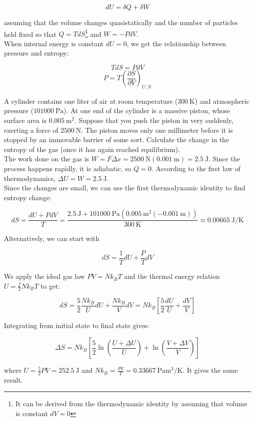 \[dU=\delta Q+\delta W\]

assuming that the volume changes quasistatically and the number of particles held fixed so that $Q=TdS$\footnote{It can be derived from the thermodynamic identity by assuming that volume is constant $dV=0$} and $W=-PdV$. \\

When internal energy is constant $dU=0$, we get the relationship between pressure and entropy:

\[TdS=PdV\]
\[P=T\left(\frac{\partial S}{\partial V}\right)_{U,N}\]

\begin{texample}
	A cylinder contains one liter of air at room temperature ($\SI{300}{\kelvin}$) and atmospheric pressure ($\SI{101000}{\pascal}$). At one end of the cylinder is a massive piston, whose surface area is $\SI{0.005}{\meter\squared}$. Suppose that you push the piston in very suddenly, exerting a force of $\SI{2500}{\newton}$. The piston moves only one millimeter before it is stopped by an immovable barrier of some sort. Calculate the change in the entropy of the gas (once it has again reached equilibrium). \\
	
	The work done on the gas is $W=F\Delta x=\SI{2500}{\newton} (\SI{0.001}{\meter})=\SI{2.5}{\joule}$. Since the process happens rapidly, it is adiabatic, so $Q=0$. According to the first law of thermodynamics, $\Delta U=W=\SI{2.5}{\joule}$. \\
	
	Since the changes are small, we can use the first thermodynamic identity to find entropy change:
	
	\[dS=\frac{dU+PdV}{T}=\frac{\SI{2.5}{\joule}+\SI{101000}{\pascal} (\SI{0.005}{\meter\squared} (-\SI{0.001}{\meter}))}{\SI{300}{\kelvin}}\approx\SI{0.00665}{\joule\per\kelvin}\]
	
	Alternatively, we can start with
	
	\[dS=\frac{1}{T}dU+\frac{P}{T}dV\]
	
	We apply the ideal gas law $PV=Nk_BT$ and the thermal energy relation $U=\frac{f}{2} Nk_BT$ to get:
	
	\[dS=\frac{5}{2}\frac{Nk_B}{U}dU+\frac{Nk_B}{V}dV=Nk_B\left[ \frac{5}{2}\frac{dU}{U}+\frac{dV}{V} \right]\]
	
	Integrating from initial state to final state gives:
	
	\[\Delta S=Nk_B\left[ \frac{5}{2}\ln\left(\frac{U+\Delta U}{U}\right)+\ln\left(\frac{V+\Delta V}{V}\right) \right]\]
	
	where $U=\frac52 PV=\SI{252.5}{\joule}$ and $Nk_B=\frac{PV}{T}=\SI{0.33667}{\pascal\meter\cubed\per\kelvin}$. It gives the same result.
\end{texample}

